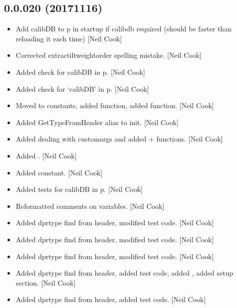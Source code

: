 \documentclass[a4paper,10pt,english]{report}
\begin{document}
\subsection{0.0.020 (2017\sphinxhyphen{}11\sphinxhyphen{}16)}
\label{\detokenize{misc/changelog:id549}}\begin{itemize}
\item {} 
Add calibDB to p in startup if calibdb required (should be faster than
reloading it each time) {[}Neil Cook{]}

\item {} 
Corrected  extractiltweightorder spelling mistake. {[}Neil Cook{]}

\item {} 
Added check for calibDB in p. {[}Neil Cook{]}

\item {} 
Added check for ‘calibDB’ in p. {[}Neil Cook{]}

\item {} 
Moved  to constants, added 
function, added  function. {[}Neil Cook{]}

\item {} 
Added GetTypeFromHeader alias to init. {[}Neil Cook{]}

\item {} 
Added dealing with customargs and added  +
 functions. {[}Neil Cook{]}

\item {} 
Added . {[}Neil Cook{]}

\item {} 
Added  constant. {[}Neil Cook{]}

\item {} 
Added tests for calibDB in p. {[}Neil Cook{]}

\item {} 
Reformatted comments on variables. {[}Neil Cook{]}

\item {} 
Added dprtype find from header, modified test code. {[}Neil Cook{]}

\item {} 
Added dprtype find from header, modified test code. {[}Neil Cook{]}

\item {} 
Added dprtype find from header, modified test code. {[}Neil Cook{]}

\item {} 
Added dprtype find from header, added test code, added , added
setup section. {[}Neil Cook{]}

\item {} 
Added dprtype find from header, added test code. {[}Neil Cook{]}

\end{itemize}
\end{document}
